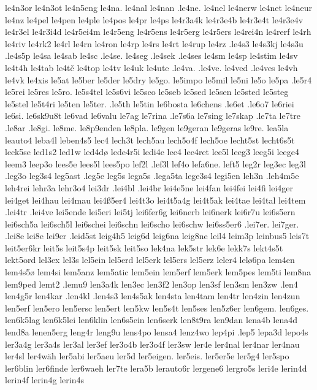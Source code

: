 {{le4n3or
le4n3ot
le4n5eng
le4na.
le4nal
le4nan
.le4ne.
le4nel
le4nerw
le4net
le4neur
le4nz
le4pel
le4pen
le4ple
le4pos
le4pr
le4ps
le4r3a4k
le4r3e4b
le4r3e4t
le4r3e4v
le4r3el
le4r3i4d
le4r5ei4m
le4r5eng
le4r5ens
le4r5erg
le4r5ers
le4rei4n
le4rerf
le4rh
le4riv
le4rk2
le4rl
le4rn
le4ron
le4rp
le4rs
le4rt
le4rup
le4rz
.le4s3
le4s3kj
le4s3u
.le4s5p
le4sa
le4sab
le4sc
.le4se.
le4seg
.le4sek
.le4ses
le4sm
le4sp
le4stim
le4sv
le4t4h
le4tab
le4tč
le4top
le4tv
le4uk
le4ute
.le4va.
.le4ve.
le4ved
.le4ves
le4vh
le4vk
le4xis
le5at
le5ber
le5der
le5dry
le5go.
le5impo
le5mil
le5ni
le5o
le5pa
.le5r4
le5rei
le5res
le5ro.
le5s4tel
le5s6vi
le5sco
le5seb
le5sed
le5sen
le5sted
le5steg
le5stel
le5t4ri
le5ten
le5ter.
.le5th
le5tin
le6bosta
le6chens
.le6et
.le6o7
le6riei
le6si.
le6sk9u8t
le6vad
le6valu
le7ag
le7rina
.le7s6a
le7sing
le7skap
.le7ta
le7tre
.le8ar
.le8gi.
le8me.
le8p9enden
le8pla.
le9gen
le9geran
le9geras
le9re.
lea5la
leauto4
leba4l
leben4s5
lec4
lech3t
lech5au
lech5o4f
lech5oe
lecht5st
lecht6s5t
leck5se
led1s2
led1w
led4dø
lede4r5i
ledi4e
lee4
lee4ret
lee5l
leeg3
leeg5i
leege4
leem3
leep3o
lees5e
lees5l
lees5po
lef2l
.lef3l
lef4o
lefa6ne.
left5
leg2r
leg3ec
leg3l
.leg3o
leg3s4
leg5ast
.leg5e
leg5s
lega5s
.lega5ta
lege3s4
legi5en
leh3n
.leh4m5e
leh4rei
lehr3a
lehr3o4
lei3dr
.lei4bl
.lei4br
lei4e5ne
lei4fan
lei4fei
lei4fi
lei4ger
lei4get
lei4hau
lei4mau
lei4ß5er4
lei4t3o
lei4t5a4g
lei4t5ak
lei4tae
lei4tal
lei4tem
.lei4tr
.lei4ve
lei5ende
lei5eri
lei5tj
lei6fer6g
lei6nerb
lei6nerk
lei6r7u
lei6s5ern
lei6sch5a
lei6sch5l
lei6schei
lei6schn
lei6scho
lei6schw
lei6ss5er6
.lei7er.
lei7ger.
.lei8e
lei8e
lei9er
.leid5st
leig4h5
leig6d
leig6na
leig8ne
leil4
leim3p
leinbus5
leis7t
leit5er6kr
leit5s
leit5s4p
leit5sk
leit5so
lek4na
lek5str
lek6e
lekk7s
lekt4s5t
lekt5ord
lel3ex
lel3s
lel5ein
lel5erd
lel5erk
lel5ers
lel5erz
leler4
lelø6pa
lem4en
lem4s5ø
lem4si
lem5anz
lem5atic
lem5ein
lem5erf
lem5erk
lem5pes
lem5ti
lem8na
lem9ped
lemt2
.lemu9
len3a4k
len3ec
len3f2
len3op
len3sf
len3sm
len3zw
.len4
len4g5r
len4kar
.len4kl
.len4s3
len4s5ak
len4sta
len4tam
len4tr
len4zin
len4zun
len5erf
len5ero
len5ersc
len5ert
len5kw
len5s4t
len5ses
len5z6er
len6gem.
len6ges.
len6k5lag
len6k5lei
len6klin
len6s5ein
len6serk
len8t9ra
len9dan
lena4b
lena4d
lend8a
lenen5erg
leng4r
leng9u
lens4po
lensa4
lenz4wo
lep4pi
.lep5
lepa3d
lepo4s
ler3a4g
ler3a4s
ler3al
ler3ef
ler3o4b
ler3o4f
ler3sw
ler4e
ler4nal
ler4nar
ler4nau
ler4sl
ler4wäh
ler5abi
ler5aeu
ler5d
ler5eigen.
ler5eis.
ler5er5e
ler5g4
ler5spo
ler6blin
ler6finde
ler6waeh
ler7te
lera5b
lerauto6r
lergene6
lergro5s
leri4e
lerin4d
lerin4f
lerin4g
lerin4s
}}
